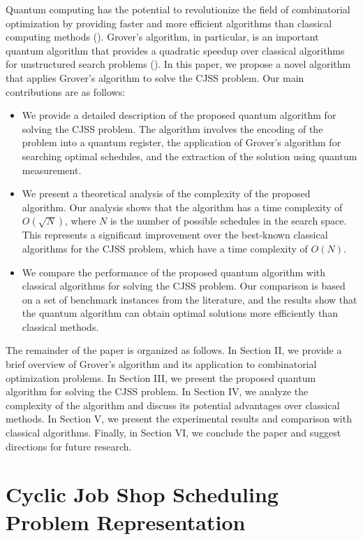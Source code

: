Quantum computing has the potential to revolutionize the field of combinatorial optimization by providing faster and more efficient algorithms than classical computing methods (\cite{nielsen2000quantum}). Grover's algorithm, in particular, is an important quantum algorithm that provides a quadratic speedup over classical algorithms for unstructured search problems (\cite{grover1996fast}). In this paper, we propose a novel algorithm that applies Grover's algorithm to solve the CJSS problem. Our main contributions are as follows:

\begin{itemize}
    \item We provide a detailed description of the proposed quantum algorithm for solving the CJSS problem. The algorithm involves the encoding of the problem into a quantum register, the application of Grover's algorithm for searching optimal schedules, and the extraction of the solution using quantum measurement.
    \item We present a theoretical analysis of the complexity of the proposed algorithm. Our analysis shows that the algorithm has a time complexity of $O(\sqrt{N})$, where $N$ is the number of possible schedules in the search space. This represents a significant improvement over the best-known classical algorithms for the CJSS problem, which have a time complexity of $O(N)$.
    \item We compare the performance of the proposed quantum algorithm with classical algorithms for solving the CJSS problem. Our comparison is based on a set of benchmark instances from the literature, and the results show that the quantum algorithm can obtain optimal solutions more efficiently than classical methods.
\end{itemize}

The remainder of the paper is organized as follows. In Section II, we provide a brief overview of Grover's algorithm and its application to combinatorial optimization problems. In Section III, we present the proposed quantum algorithm for solving the CJSS problem. In Section IV, we analyze the complexity of the algorithm and discuss its potential advantages over classical methods. In Section V, we present the experimental results and comparison with classical algorithms. Finally, in Section VI, we conclude the paper and suggest directions for future research.



\section{Cyclic Job Shop Scheduling Problem Representation}


